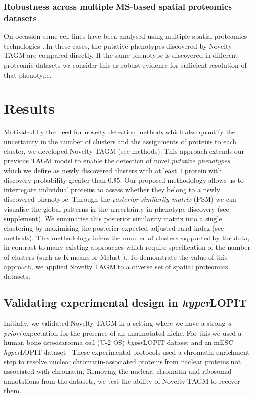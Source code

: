 \documentclass[12pt,english]{article}
\begin{document}
\subsubsection{Robustness across multiple MS-based spatial proteomics datasets}
On occasion some cell lines have been analysed using multiple spatial proteomics technologies \citep{DC:2018}. In these cases, the putative phenotypes discovered by Novelty TAGM are compared directly. If the same phenotype is discovered in different proteomic datasets we consider this as robust evidence for sufficient resolution of that phenotype.

\clearpage
\section{Results}
Motivated by the need for novelty detection methods which also quantify the uncertainty in the number of clusters and the assignments of proteins to each cluster, we developed Novelty TAGM (see methods). This approach extends our previous TAGM model \citep{Crook:2018} to enable the detection of novel \textit{putative phenotypes}, which we define as newly discovered clusters with at least $1$ protein with discovery probability greater than $0.95$. Our proposed methodology allows us to interrogate individual proteins to assess whether they belong to a newly discovered phenotype. Through the \textit{posterior similarity matrix} (PSM) we can visualise the global patterns in the uncertainty in phenotype discovery (see supplement). We summarise this posterior similarity matrix into a single clustering by maximising the posterior expected adjusted rand index (see methods). This methodology infers the number of clusters supported by the data, in contrast to many existing approaches which require specification of the number of clusters (such as K-means or Mclust \citep{mclust}). To demonstrate the value of this approach, we applied Novelty TAGM to a diverse set of spatial proteomics datasets.

\subsection{Validating experimental design in \textit{hyper}LOPIT}
Initially, we validated Novelty TAGM in a setting where we have a strong \textit{a priori} expectation for the presence of an unannotated niche. For this we used a human bone osteosarcoma cell (U-2 OS) \textit{hyper}LOPIT dataset \citep{Thul:2017} and an mESC \textit{hyper}LOPIT dataset \citep{hyper}. These experimental protocols used a chromatin enrichment step to resolve nuclear chromatin-associated proteins from nuclear proteins not associated with chromatin. Removing the nuclear, chromatin and ribosomal annotations from the datasets, we test the ability of Novelty TAGM to recover them.
\end{document}
